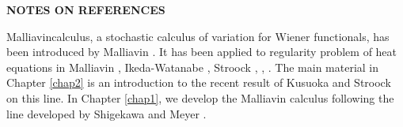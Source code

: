 \newpage

\begin{center}
\textbf{NOTES ON REFERENCES}
\end{center}

Malliavin\pageoriginale calculus, a stochastic calculus of variation
for Wiener 
functionals, has been introduced by Malliavin \cite{key7}. It has been
applied to regularity problem of heat equations in Malliavin \cite{key8},
Ikeda-Watanabe \cite{key3}, Stroock \cite{key16}, \cite{key17},
\cite{key18}. The main material in 
Chapter \ref{chap2} is an introduction to the recent result of Kusuoka and
Stroock on this line. In Chapter \ref{chap1}, we develop the Malliavin
calculus following the line developed by Shigekawa \cite{key13} and Meyer
\cite{key10}. 

\medskip
{}

